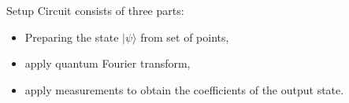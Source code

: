 \documentclass[english]{beamer}
\newcommand{\ket}[1]{\vert#1\rangle}
\begin{document}
\begin{frame}{Setup}
 Circuit consists of three parts:
 \begin{itemize}
  \item Preparing the state $\ket{\psi}$ from set of points,
  \pause
  \item apply quantum Fourier transform,
  \pause
  \item apply measurements to obtain the coefficients of the output state.
 \end{itemize}

\end{frame}


\end{document}
